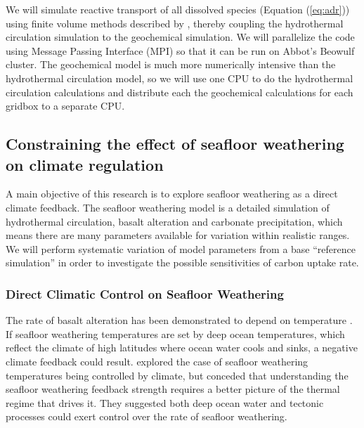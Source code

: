 \documentclass[authoryear,round,12pt]{article}
\begin{document}
We will simulate reactive transport of all dissolved species (Equation
(\ref{eq:adr})) using finite volume methods described by
\citet{leveque2004}, thereby coupling the hydrothermal circulation
simulation to the geochemical simulation. We will parallelize the code
using Message Passing Interface (MPI) so that it can be run on Abbot's
Beowulf cluster. The geochemical model is much more numerically
intensive than the hydrothermal circulation model, so we will use one
CPU to do the hydrothermal circulation calculations and distribute
each the geochemical calculations for each gridbox to a separate CPU.


\subsection{Constraining the effect of seafloor weathering on climate regulation}
\label{sec:constraining}

A main objective of this research is to explore seafloor weathering as
a direct climate feedback. The seafloor weathering model is a detailed
simulation of hydrothermal circulation, basalt alteration and
carbonate precipitation, which means there are many parameters
available for variation within realistic ranges. We will perform systematic
variation of model parameters from a base ``reference simulation'' in
order to investigate the possible sensitivities of carbon uptake
rate. 

\subsubsection{Direct Climatic Control on Seafloor Weathering}

The rate of basalt alteration has been demonstrated to depend on
temperature \citep{gislason1993, oelkers2001, gislason2003}. If
seafloor weathering temperatures are set by deep ocean temperatures,
which reflect the climate of high latitudes where ocean water cools
and sinks, a negative climate feedback could result. \citet{brady1997}
explored the case of seafloor weathering temperatures being controlled
by climate, but conceded that understanding the seafloor weathering
feedback strength requires a better picture of the thermal regime that
drives it. They suggested both deep ocean water and tectonic processes
could exert control over the rate of seafloor weathering.
\end{document}
